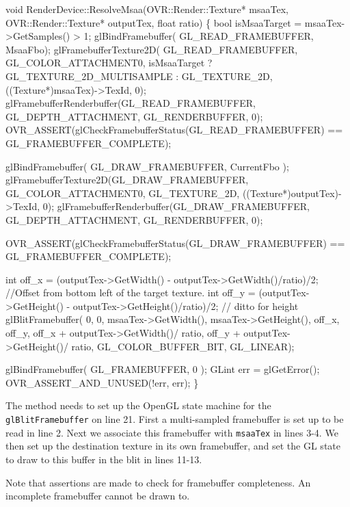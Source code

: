\documentclass[12pt,a4paper,twoside,openright]{report}
\begin{document}
\begin{smallcode}[commandchars=\\\{\}, numbers=left]
void RenderDevice::ResolveMsaa(OVR::Render::Texture* msaaTex, OVR::Render::Texture* outputTex, float ratio)
\{
    bool isMsaaTarget = msaaTex->GetSamples() > 1;
    glBindFramebuffer( GL_READ_FRAMEBUFFER, MsaaFbo);
    glFramebufferTexture2D( GL_READ_FRAMEBUFFER, GL_COLOR_ATTACHMENT0,
                            isMsaaTarget ? GL_TEXTURE_2D_MULTISAMPLE : GL_TEXTURE_2D,
                            ((Texture*)msaaTex)->TexId, 0);
    glFramebufferRenderbuffer(GL_READ_FRAMEBUFFER, GL_DEPTH_ATTACHMENT, GL_RENDERBUFFER, 0);
    OVR_ASSERT(glCheckFramebufferStatus(GL_READ_FRAMEBUFFER) == GL_FRAMEBUFFER_COMPLETE);

    glBindFramebuffer( GL_DRAW_FRAMEBUFFER, CurrentFbo );
    glFramebufferTexture2D(GL_DRAW_FRAMEBUFFER, GL_COLOR_ATTACHMENT0, GL_TEXTURE_2D, ((Texture*)outputTex)->TexId, 0);
    glFramebufferRenderbuffer(GL_DRAW_FRAMEBUFFER, GL_DEPTH_ATTACHMENT, GL_RENDERBUFFER, 0);

    OVR_ASSERT(glCheckFramebufferStatus(GL_DRAW_FRAMEBUFFER) == GL_FRAMEBUFFER_COMPLETE);

\color{green}    int off_x = (outputTex->GetWidth() - outputTex->GetWidth()/ratio)/2; //Offset from bottom left of the target texture. 
\color{green}    int off_y = (outputTex->GetHeight() - outputTex->GetHeight()/ratio)/2; // ditto for height
\color{green}    glBlitFramebuffer( 0, 0, msaaTex->GetWidth(), msaaTex->GetHeight(), off_x, off_y,
\color{green}                             off_x + outputTex->GetWidth()/ ratio,
\color{green}                             off_y + outputTex->GetHeight()/ ratio,
\color{green}                             GL_COLOR_BUFFER_BIT, GL_LINEAR);

    glBindFramebuffer( GL_FRAMEBUFFER, 0 );  
    GLint err = glGetError();
    OVR_ASSERT_AND_UNUSED(!err, err);
\}
\end{smallcode}

\noindent The method needs to set up the OpenGL state machine for the \texttt{glBlitFramebuffer} on line 21. First a multi-sampled framebuffer is set up to be read in line 2. Next we associate this framebuffer with \texttt{msaaTex} in lines 3-4. 
We then set up the destination texture in its own framebuffer, and set the GL state to draw to this buffer in the blit in lines 11-13.

Note that assertions are made to check for framebuffer completeness. An incomplete framebuffer cannot be drawn to.
\end{document}
